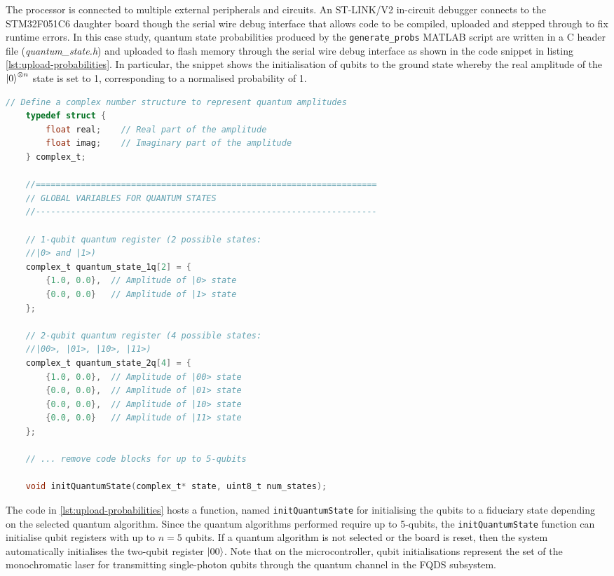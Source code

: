 The processor is connected to multiple external peripherals and circuits. An ST-LINK/V2 in-circuit debugger connects to the STM32F051C6 daughter board though the serial wire debug interface that allows code to be compiled, uploaded and stepped through to fix runtime errors. In this case study, quantum state probabilities produced by the \texttt{generate\_probs} MATLAB script are written in a C header file (\textit{quantum\_state.h}) and uploaded to flash memory through the serial wire debug interface as shown in the code snippet in listing \ref{lst:upload-probabilities}. In particular, the snippet shows the initialisation of qubits to the ground state whereby the real amplitude of the $\ket{0}^{\otimes n}$ state is set to 1, corresponding to a normalised probability of 1. 
\begin{lstlisting}[language=C, caption={Snippet code from C header file for initialising qubits in the STM32 microcontroller.}, label={lst:upload-probabilities}]
	// Define a complex number structure to represent quantum amplitudes
	typedef struct {
		float real;    // Real part of the amplitude
		float imag;    // Imaginary part of the amplitude
	} complex_t;
	
	//====================================================================
	// GLOBAL VARIABLES FOR QUANTUM STATES
	//--------------------------------------------------------------------
	
	// 1-qubit quantum register (2 possible states: 
	//|0> and |1>)
	complex_t quantum_state_1q[2] = {
		{1.0, 0.0},  // Amplitude of |0> state
		{0.0, 0.0}   // Amplitude of |1> state
	};
	
	// 2-qubit quantum register (4 possible states: 
	//|00>, |01>, |10>, |11>)
	complex_t quantum_state_2q[4] = {
		{1.0, 0.0},  // Amplitude of |00> state
		{0.0, 0.0},  // Amplitude of |01> state
		{0.0, 0.0},  // Amplitude of |10> state
		{0.0, 0.0}   // Amplitude of |11> state
	};

	// ... remove code blocks for up to 5-qubits
	
	void initQuantumState(complex_t* state, uint8_t num_states);
\end{lstlisting}
The code in \ref{lst:upload-probabilities} hosts a function, named \texttt{initQuantumState} for initialising the qubits to a fiduciary state depending on the selected quantum algorithm. Since the quantum algorithms performed require up to 5-qubits, the \texttt{initQuantumState} function can initialise qubit registers with up to $n = 5$ qubits. If a quantum algorithm is not selected or the board is reset, then the system automatically initialises the two-qubit register $\ket{00}$. Note that on the microcontroller, qubit initialisations represent the set of the monochromatic laser for transmitting single-photon qubits through the quantum channel in the FQDS subsystem. 

